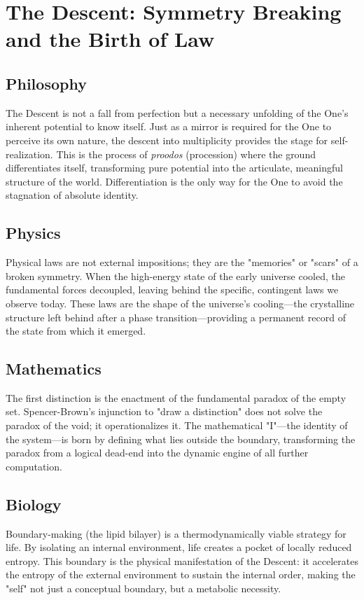 \section{The Descent: Symmetry Breaking and the Birth of Law}

\subsection{Philosophy}
The Descent is not a fall from perfection but a necessary unfolding of the One’s inherent potential to know itself. Just as a mirror is required for the One to perceive its own nature, the descent into multiplicity provides the stage for self-realization. This is the process of \textit{proodos} (procession) where the ground differentiates itself, transforming pure potential into the articulate, meaningful structure of the world. Differentiation is the only way for the One to avoid the stagnation of absolute identity.

\subsection{Physics}
Physical laws are not external impositions; they are the "memories" or "scars" of a broken symmetry. When the high-energy state of the early universe cooled, the fundamental forces decoupled, leaving behind the specific, contingent laws we observe today. These laws are the shape of the universe's cooling—the crystalline structure left behind after a phase transition—providing a permanent record of the state from which it emerged.

\subsection{Mathematics}
The first distinction is the enactment of the fundamental paradox of the empty set. Spencer-Brown’s injunction to "draw a distinction" does not solve the paradox of the void; it operationalizes it. The mathematical "I"—the identity of the system—is born by defining what lies outside the boundary, transforming the paradox from a logical dead-end into the dynamic engine of all further computation.

\subsection{Biology}
Boundary-making (the lipid bilayer) is a thermodynamically viable strategy for life. By isolating an internal environment, life creates a pocket of locally reduced entropy. This boundary is the physical manifestation of the Descent: it accelerates the entropy of the external environment to sustain the internal order, making the "self" not just a conceptual boundary, but a metabolic necessity.

